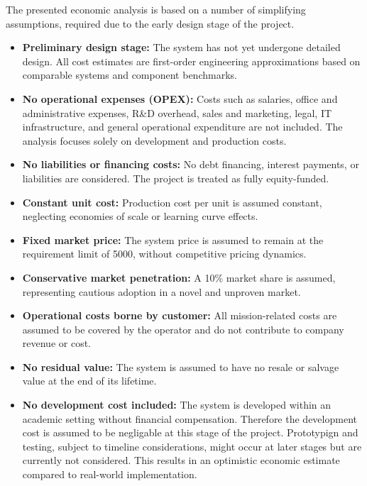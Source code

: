 The presented economic analysis is based on a number of simplifying assumptions, required due to the early design stage of the project.
\vspace{-5pt}
\begin{itemize}[noitemsep, topsep=2pt]

\item \textbf{Preliminary design stage:}
The system has not yet undergone detailed design. All cost estimates are first-order engineering approximations based on comparable systems and component benchmarks.

\item \textbf{No operational expenses (OPEX):}
Costs such as salaries, office and administrative expenses, R\&D overhead, sales and marketing, legal, IT infrastructure, and general operational expenditure are not included. The analysis focuses solely on development and production costs.

\item \textbf{No liabilities or financing costs:}
No debt financing, interest payments, or liabilities are considered. The project is treated as fully equity-funded.

\item \textbf{Constant unit cost:}
Production cost per unit is assumed constant, neglecting economies of scale or learning curve effects.

\item \textbf{Fixed market price:}
The system price is assumed to remain at the requirement limit of \texteuro{}5000, without competitive pricing dynamics.

\item \textbf{Conservative market penetration:}
A 10\% market share is assumed, representing cautious adoption in a novel and unproven market.

\item \textbf{Operational costs borne by customer:}
All mission-related costs are assumed to be covered by the operator and do not contribute to company revenue or cost.

\item \textbf{No residual value:}
The system is assumed to have no resale or salvage value at the end of its lifetime.

\item \textbf{No development cost included:}
The system is developed within an academic setting without financial compensation. Therefore the development cost is assumed to be negligable at this stage of the project. Prototypign and testing, subject to timeline considerations, might occur at later stages but are currently not considered.
 This results in an optimistic economic estimate compared to real-world implementation.

\end{itemize}

